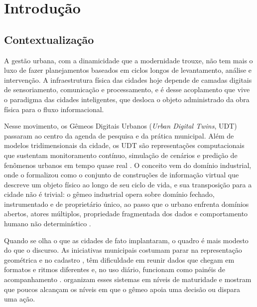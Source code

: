 \chapter{Introdução}
\label{cap:introducao}

\section{Contextualização}
\label{sec:contextualizacao}

A gestão urbana, com a dinamicidade que a modernidade trouxe, não tem mais o luxo de fazer planejamentos baseados em ciclos longos de levantamento, análise e intervenção. A infraestrutura física das cidades hoje depende de camadas digitais de sensoriamento, comunicação e processamento, e é desse acoplamento que vive o paradigma das cidades inteligentes, que desloca o objeto administrado da obra física para o fluxo informacional.

Nesse movimento, os Gêmeos Digitais Urbanos (\textit{Urban Digital Twins}, UDT) passaram ao centro da agenda de pesquisa e da prática municipal. Além de modelos tridimensionais da cidade, os UDT são representações computacionais que sustentam monitoramento contínuo, simulação de cenários e predição de fenômenos urbanos em tempo quase real \cite{ferrebigorra2022adoption,shahat2021city}. O conceito vem do domínio industrial, onde  o formalizou como o conjunto de construções de informação virtual que descreve um objeto físico ao longo de seu ciclo de vida, e sua transposição para a cidade não é trivial: o gêmeo industrial opera sobre domínio fechado, instrumentado e de proprietário único, ao passo que o urbano enfrenta domínios abertos, atores múltiplos, propriedade fragmentada dos dados e comportamento humano não determinístico \cite{batty2018digital,yeh2024from}.

Quando se olha o que as cidades de fato implantaram, o quadro é mais modesto do que o discurso. As iniciativas municipais costumam parar na representação geométrica e no cadastro \cite{ketzler2020digital}, têm dificuldade em reunir dados que chegam em formatos e ritmos diferentes \cite{lehtola2022digital} e, no uso diário, funcionam como painéis de acompanhamento \cite{ferrebigorra2022adoption}.  organizam esses sistemas em níveis de maturidade e mostram que poucos alcançam os níveis em que o gêmeo apoia uma decisão ou dispara uma ação.

